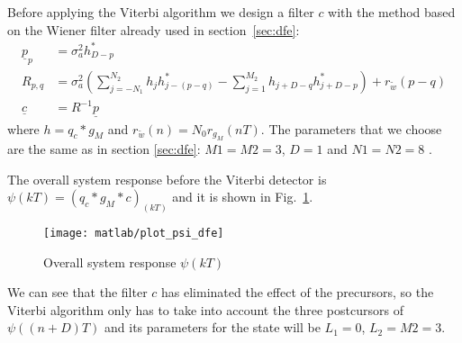 \documentclass[a4paper,oneside]{article}
\renewcommand{\vec}[1]{\underline{#1}}
\begin{document}
Before applying the Viterbi algorithm we design a filter $c$ with the
method based on the Wiener filter already used in
section~\ref{sec:dfe}:
\begin{align}
  \vec{p}_p &= \sigma^2_ah^*_{D-p} \\
  R_{p,q} &= \sigma^2_a\left( \sum_{j=-N_1}^{N_2}h_jh^*_{j-(p-q)} - \sum_{j=1}^{M_2}h_{j+D-q}h^*_{j+D-p} \right) + r_{\tilde{w}}(p-q) \\
    \vec{c} &= R^{-1} \vec{p}
\end{align}
where $h = q_c * g_M$ and $r_{\tilde{w}}(n) = N_0 r_{g_M}(nT)$. The
parameters that we choose are the same as in section \ref{sec:dfe}:
$M1 = M2 = 3$, $D=1$ {\color{red} and $N1 = N2 = 8$ }.

The overall system response before the Viterbi detector is $\psi(kT) =
(q_c * g_M * c)_{(kT)}$ and it is shown in Fig.~\ref{plot:psi_dfe}.
\begin{figure}[htbp]
  \centering
  \texttt{[image: matlab/plot\_psi\_dfe]}
  \caption{Overall system response $\psi(kT)$}
  \label{plot:psi_dfe}
\end{figure}
We can see that the filter $c$ has eliminated the effect of the
precursors, so the Viterbi algorithm only has to take into account the
three postcursors of $\psi((n+D)T)$ and its parameters for the state
will be $L_1 = 0$, $L_2 = M2 = 3$.
\end{document}
